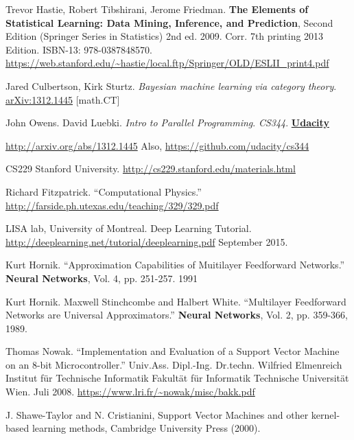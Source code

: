 \documentclass[10pt]{amsart}
\begin{document}
\begin{thebibliography}{9}
Trevor Hastie, Robert Tibshirani, Jerome Friedman.   \textbf{The Elements of Statistical Learning: Data Mining, Inference, and Prediction}, Second Edition (Springer Series in Statistics) 2nd ed. 2009. Corr. 7th printing 2013 Edition.  ISBN-13: 978-0387848570.  \url{https://web.stanford.edu/~hastie/local.ftp/Springer/OLD/ESLII_print4.pdf}

Jared Culbertson, Kirk Sturtz.  \emph{Bayesian machine learning via category theory}.  \href{http://arxiv.org/abs/1312.1445}{arXiv:1312.1445} [math.CT]

John Owens.  David Luebki.  \emph{Intro to Parallel Programming}.  \emph{CS344}.  \textbf{\href{https://www.udacity.com/}{Udacity}}  
  
\url{http://arxiv.org/abs/1312.1445} Also, \url{https://github.com/udacity/cs344}  

CS229 Stanford University.  \url{http://cs229.stanford.edu/materials.html}


Richard Fitzpatrick.  ``Computational Physics.''  \url{http://farside.ph.utexas.edu/teaching/329/329.pdf}

LISA lab, University of Montreal.  Deep Learning Tutorial.  \url{http://deeplearning.net/tutorial/deeplearning.pdf}  September 2015.  



Kurt Hornik. ``Approximation Capabilities of Muitilayer Feedforward Networks.''  \textbf{Neural Networks}, Vol. 4, pp. 251-257. 1991

Kurt Hornik. Maxwell Stinchcombe and Halbert White.  ``Multilayer Feedforward Networks are Universal Approximators.''  \textbf{Neural Networks}, Vol. 2, pp. 359-366, 1989.  

Thomas Nowak.  ``Implementation and Evaluation of a Support Vector Machine on an 8-bit Microcontroller.''  Univ.Ass. Dipl.-Ing. Dr.techn. Wilfried Elmenreich Institut f\"{u}r Technische Informatik Fakult\"{a}t f\"{u}r Informatik Technische Universit\"{a}t Wien.  Juli 2008.  \url{https://www.lri.fr/~nowak/misc/bakk.pdf}



J.  Shawe-Taylor  and  N.  Cristianini,  Support  Vector  Machines  and  other  kernel-based  learning  methods,
Cambridge University Press (2000).




\end{thebibliography}
\end{document}
